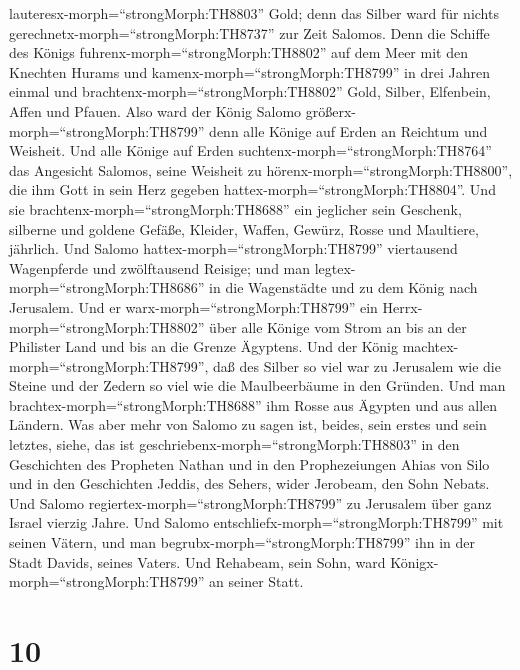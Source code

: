 lauteresx-morph=``strongMorph:TH8803'' Gold; denn das Silber ward für
nichts gerechnetx-morph=``strongMorph:TH8737'' zur Zeit Salomos.
 Denn die Schiffe des Königs
fuhrenx-morph=``strongMorph:TH8802'' auf dem Meer mit den Knechten
Hurams und kamenx-morph=``strongMorph:TH8799'' in drei Jahren einmal und
brachtenx-morph=``strongMorph:TH8802'' Gold, Silber, Elfenbein, Affen
und Pfauen.  Also ward der König Salomo
größerx-morph=``strongMorph:TH8799'' denn alle Könige auf Erden an
Reichtum und Weisheit.  Und alle Könige auf Erden
suchtenx-morph=``strongMorph:TH8764'' das Angesicht Salomos, seine
Weisheit zu hörenx-morph=``strongMorph:TH8800'', die ihm Gott in sein
Herz gegeben hattex-morph=``strongMorph:TH8804''.  Und sie
brachtenx-morph=``strongMorph:TH8688'' ein jeglicher sein Geschenk,
silberne und goldene Gefäße, Kleider, Waffen, Gewürz, Rosse und
Maultiere, jährlich.  Und Salomo
hattex-morph=``strongMorph:TH8799'' viertausend Wagenpferde und
zwölftausend Reisige; und man legtex-morph=``strongMorph:TH8686'' in die
Wagenstädte und zu dem König nach Jerusalem.  Und er
warx-morph=``strongMorph:TH8799'' ein Herrx-morph=``strongMorph:TH8802''
über alle Könige vom Strom an bis an der Philister Land und bis an die
Grenze Ägyptens.  Und der König
machtex-morph=``strongMorph:TH8799'', daß des Silber so viel war zu
Jerusalem wie die Steine und der Zedern so viel wie die Maulbeerbäume in
den Gründen.  Und man brachtex-morph=``strongMorph:TH8688''
ihm Rosse aus Ägypten und aus allen Ländern.  Was aber mehr
von Salomo zu sagen ist, beides, sein erstes und sein letztes, siehe,
das ist geschriebenx-morph=``strongMorph:TH8803'' in den Geschichten des
Propheten Nathan und in den Prophezeiungen Ahias von Silo und in den
Geschichten Jeddis, des Sehers, wider Jerobeam, den Sohn Nebats.
 Und Salomo regiertex-morph=``strongMorph:TH8799'' zu
Jerusalem über ganz Israel vierzig Jahre.  Und Salomo
entschliefx-morph=``strongMorph:TH8799'' mit seinen Vätern, und man
begrubx-morph=``strongMorph:TH8799'' ihn in der Stadt Davids, seines
Vaters. Und Rehabeam, sein Sohn, ward
Königx-morph=``strongMorph:TH8799'' an seiner Statt.

\hypertarget{section-9}{%
\section{10}\label{section-9}}

